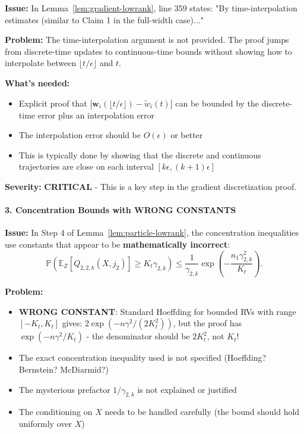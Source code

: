 \textbf{Issue:} In Lemma~\ref{lem:gradient-lowrank}, line 359 states: "By time-interpolation estimates (similar to Claim 1 in the full-width case)..."

\textbf{Problem:} The time-interpolation argument is not provided. The proof jumps from discrete-time updates to continuous-time bounds without showing how to interpolate between $\lfloor t/\epsilon\rfloor$ and $t$.

\textbf{What's needed:}
\begin{itemize}
\item Explicit proof that $|\mathbf{w}_i(\lfloor t/\epsilon\rfloor) - \tilde{w}_i(t)|$ can be bounded by the discrete-time error plus an interpolation error
\item The interpolation error should be $O(\epsilon)$ or better
\item This is typically done by showing that the discrete and continuous trajectories are close on each interval $[k\epsilon, (k+1)\epsilon]$
\end{itemize}

\textbf{Severity:} \textbf{CRITICAL} - This is a key step in the gradient discretization proof.

\paragraph*{3. Concentration Bounds with WRONG CONSTANTS}

\textbf{Issue:} In Step 4 of Lemma~\ref{lem:particle-lowrank}, the concentration inequalities use constants that appear to be \textbf{mathematically incorrect}:
\[
\mathbb{P}\left(\mathbb{E}_Z[Q_{2,2,k}(X, j_2)] \ge K_t\gamma_{2,k}\right) \le \frac{1}{\gamma_{2,k}}\exp\left(-\frac{n_1\gamma_{2,k}^2}{K_t}\right).
\]

\textbf{Problem:}
\begin{itemize}
\item \textbf{WRONG CONSTANT}: Standard Hoeffding for bounded RVs with range $[-K_t, K_t]$ gives: $2\exp(-n\gamma^2/(2K_t^2))$, but the proof has $\exp(-n\gamma^2/K_t)$ - the denominator should be $2K_t^2$, not $K_t$!
\item The exact concentration inequality used is not specified (Hoeffding? Bernstein? McDiarmid?)
\item The mysterious prefactor $1/\gamma_{2,k}$ is not explained or justified
\item The conditioning on $X$ needs to be handled carefully (the bound should hold uniformly over $X$)
\end{itemize}

